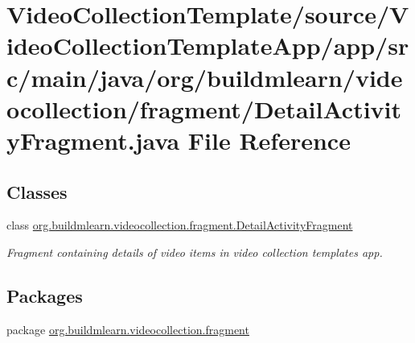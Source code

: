 \hypertarget{VideoCollectionTemplate_2source_2VideoCollectionTemplateApp_2app_2src_2main_2java_2org_2buildmle0499cacd4ed87567fd1ea39b0dbd3950}{}\section{Video\+Collection\+Template/source/\+Video\+Collection\+Template\+App/app/src/main/java/org/buildmlearn/videocollection/fragment/\+Detail\+Activity\+Fragment.java File Reference}
\label{VideoCollectionTemplate_2source_2VideoCollectionTemplateApp_2app_2src_2main_2java_2org_2buildmle0499cacd4ed87567fd1ea39b0dbd3950}
\subsection*{Classes}
\begin{DoxyCompactItemize}
\item 
class \hyperlink{classorg_1_1buildmlearn_1_1videocollection_1_1fragment_1_1DetailActivityFragment}{org.\+buildmlearn.\+videocollection.\+fragment.\+Detail\+Activity\+Fragment}
\begin{DoxyCompactList}\small\item\em Fragment containing details of video items in video collection template\textquotesingle{}s app. \end{DoxyCompactList}\end{DoxyCompactItemize}
\subsection*{Packages}
\begin{DoxyCompactItemize}
\item 
package \hyperlink{namespaceorg_1_1buildmlearn_1_1videocollection_1_1fragment}{org.\+buildmlearn.\+videocollection.\+fragment}
\end{DoxyCompactItemize}
